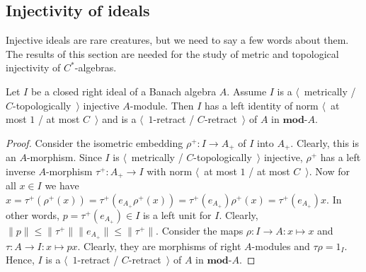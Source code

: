 
\subsection{
    Injectivity of ideals}\label{SubSectionInjectivityOfIdeals}

Injective ideals are rare creatures, but we need to say a few words about them.
The results of this section are needed for the study of metric and topological
injectivity of $C^*$-algebras.

\begin{proposition}\label{MetTopInjOfId} Let $I$ be a closed right ideal of a Banach
algebra $A$. Assume $I$ is a $\langle$~metrically / $C$-topologically~$\rangle$
injective $A$-module. Then $I$ has a left identity of norm $\langle$~at most $1$
/ at most $C$~$\rangle$ and is a $\langle$~$1$-retract / $C$-retract~$\rangle$
of $A$ in $\mathbf{mod}\text{-}A$.
\end{proposition}
\begin{proof} Consider the isometric embedding $\rho^+:I\to A_+$ of $I$ into $A_+$.
Clearly, this is an $A$-morphism. Since $I$ is $\langle$~metrically /
$C$-topologically~$\rangle$ injective, $\rho^+$ has a left inverse
$A$-morphism $\tau^+:A_+\to I$ with norm $\langle$~at most $1$ / at most
$C$~$\rangle$. Now for all $x\in I$ we have
$x
=\tau^+(\rho^+(x))
=\tau^+(e_{A_+}\rho^+(x))
=\tau^+(e_{A_+})\rho^+(x)=\tau^+(e_{A_+})x$.
In other words, $p=\tau^+(e_{A_+})\in I$ is a left unit for $I$. Clearly, 
$\lVert p\rVert
\leq\lVert\tau^+\rVert\lVert e_{A_+}\rVert
\leq\lVert\tau^+\rVert$. Consider the maps
$\rho:I\to A:x\mapsto x$ and $\tau:A\to I:x\mapsto p x$. Clearly, they are
morphisms of right $A$-modules and $\tau\rho=1_I$. Hence, $I$ is a
$\langle$~$1$-retract / $C$-retract~$\rangle$ of $A$ in $\mathbf{mod}\text{-}A$.
\end{proof}

